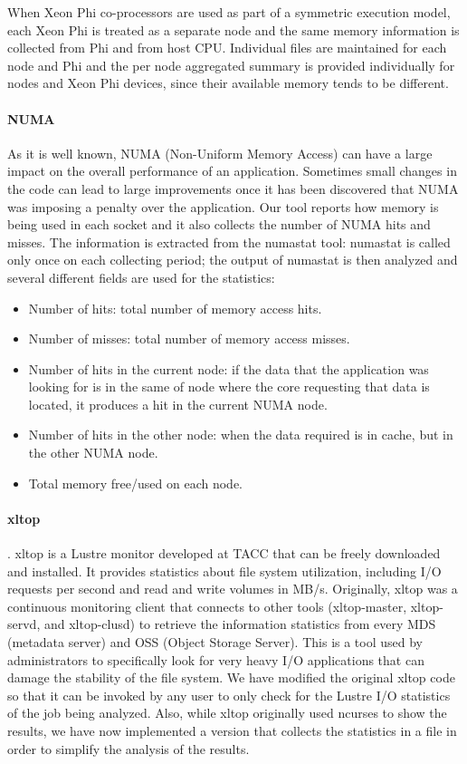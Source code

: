 \documentclass[10pt,a4paper]{report}
\begin{document}
When Xeon Phi co-processors are used as part of a symmetric execution model, each Xeon Phi is treated as a separate node and the same memory information is collected from Phi and from host CPU. Individual files are maintained for each node and Phi and the per node aggregated summary is provided individually for nodes and Xeon Phi devices, since their available memory tends to be different.

\paragraph{NUMA}
As it is well known, NUMA (Non-Uniform Memory Access) can have a large impact on the overall performance of an application. Sometimes small changes in the code can lead to large improvements once it has been discovered that NUMA was imposing a penalty over the application. Our tool reports how memory is being used in each socket and it also collects the number of NUMA hits and misses. The information is extracted from the numastat tool: numastat is called only once on each collecting period; the output of numastat is then analyzed and several different fields are used for the statistics:

\begin{itemize}
	\item Number of hits: total number of memory access hits. 
	\item Number of misses: total number of memory access misses. 
	\item Number of hits in the current node: if the data that the application was looking for is in the same of node where the core requesting that data is located, it produces a hit in the current NUMA node.
	\item Number of hits in the other node: when the data required is in cache, but in the other NUMA node.
	\item Total memory free/used on each node.
\end{itemize}


\paragraph{xltop} \cite{xltop}. xltop is a Lustre monitor developed at TACC that can be freely downloaded and installed. It provides statistics about file system utilization, including I/O requests per second and read and write volumes in MB/s. Originally, xltop was a continuous monitoring client that connects to other tools (xltop-master, xltop-servd, and xltop-clusd) to retrieve the information statistics from every MDS (metadata server) and OSS (Object Storage Server). This is a tool used by administrators to specifically look for very heavy I/O applications that can damage the stability of the file system. We have modified the original xltop code so that it can be invoked by any user to only check for the Lustre I/O statistics of the job being analyzed. Also, while xltop originally used ncurses to show the results, we have now implemented a version that collects the statistics in a file in order to simplify the analysis of the results.
\end{document}
